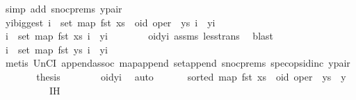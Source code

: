 \begin{isabellebody}
\ {\isacharparenleft}simp\ add{\isacharcolon}\ snoc{\isachardot}prems{\isacharparenleft}{}{\isacharparenright}\ y{\isacharunderscore}pair{\isacharparenright}\isanewline
\ \ \isamarkupfalse%
\ yi{\isacharunderscore}biggest{\isacharcolon}\ {\isachardoublequoteopen}{\isasymforall}i\ {\isasymin}\ set\ {\isacharparenleft}map\ fst\ {\isacharparenleft}xs\ {\isacharat}\ {\isacharbrackleft}{\isacharparenleft}oid{\isacharcomma}\ oper{\isacharparenright}{\isacharbrackright}\ {\isacharat}\ ys{\isacharparenright}{\isacharparenright}{\isachardot}\ i\ {\isacharless}\ yi{\isachardoublequoteclose}\isanewline
\ \ \isamarkupfalse%
\ {\isacharminus}\isanewline
\ \ \ \ \isamarkupfalse%
\ {\isachardoublequoteopen}{\isasymforall}i\ {\isasymin}\ set\ {\isacharparenleft}map\ fst\ xs{\isacharparenright}{\isachardot}\ i\ {\isacharless}\ yi{\isachardoublequoteclose}\isanewline
\ \ \ \ \ \ \isamarkupfalse%
\ oid{\isacharunderscore}yi\ assms{\isacharparenleft}{}{\isacharparenright}\ less{\isacharunderscore}trans\ \isamarkupfalse%
\ blast\isanewline
\ \ \ \ \isamarkupfalse%
\ \isamarkupfalse%
\ {\isachardoublequoteopen}{\isasymforall}i\ {\isasymin}\ set\ {\isacharparenleft}map\ fst\ ys{\isacharparenright}{\isachardot}\ i\ {\isacharless}\ yi{\isachardoublequoteclose}\isanewline
\ \ \ \ \ \ \isamarkupfalse%
\ {\isacharparenleft}metis\ UnCI\ append{\isacharunderscore}assoc\ map{\isacharunderscore}append\ set{\isacharunderscore}append\ snoc{\isachardot}prems{\isacharparenleft}{}{\isacharparenright}\ spec{\isacharunderscore}ops{\isacharunderscore}id{\isacharunderscore}inc\ y{\isacharunderscore}pair{\isacharparenright}\isanewline
\ \ \ \ \isamarkupfalse%
\ \isamarkupfalse%
\ {\isacharquery}thesis\isanewline
\ \ \ \ \ \ \isamarkupfalse%
\ oid{\isacharunderscore}yi\ \isamarkupfalse%
\ auto\isanewline
\ \ \isamarkupfalse%
\isanewline
\ \ \isamarkupfalse%
\ {\isachardoublequoteopen}sorted\ {\isacharparenleft}map\ fst\ {\isacharparenleft}xs\ {\isacharat}\ {\isacharbrackleft}{\isacharparenleft}oid{\isacharcomma}\ oper{\isacharparenright}{\isacharbrackright}\ {\isacharat}\ ys\ {\isacharat}\ {\isacharbrackleft}y{\isacharbrackright}{\isacharparenright}{\isacharparenright}{\isachardoublequoteclose}\isanewline
\ \ \isamarkupfalse%
\ {\isacharminus}\isanewline
\ \ \ \ \isamarkupfalse%
\ IH\ \isamarkupfalse%

\end{isabellebody}
